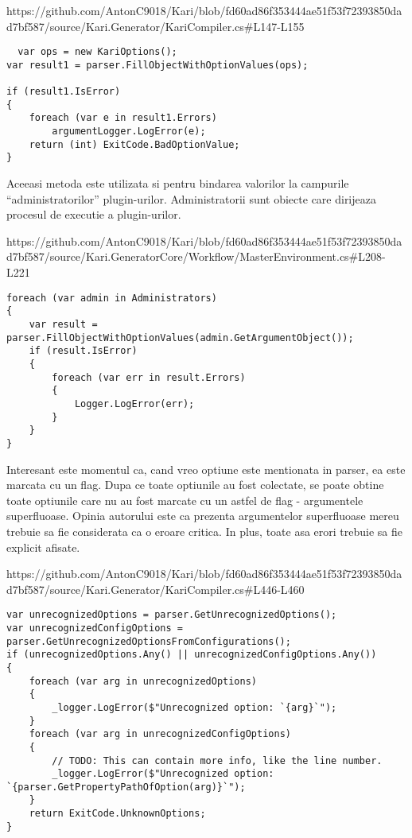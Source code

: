\documentclass{report}
\begin{document}
https://github.com/AntonC9018/Kari/blob/fd60ad86f353444ae51f53f72393850dad7bf587/source/Kari.Generator/KariCompiler.cs\#L147-L155

\begin{lstlisting}
  var ops = new KariOptions();
var result1 = parser.FillObjectWithOptionValues(ops);

if (result1.IsError)
{
    foreach (var e in result1.Errors)
        argumentLogger.LogError(e);
    return (int) ExitCode.BadOptionValue;
}
\end{lstlisting}

Aceeasi metoda este utilizata si pentru bindarea valorilor la campurile
``administratorilor'' plugin-urilor. Administratorii sunt obiecte care
dirijeaza procesul de executie a plugin-urilor.

https://github.com/AntonC9018/Kari/blob/fd60ad86f353444ae51f53f72393850dad7bf587/source/Kari.GeneratorCore/Workflow/MasterEnvironment.cs\#L208-L221

\begin{lstlisting}
foreach (var admin in Administrators)
{
    var result = parser.FillObjectWithOptionValues(admin.GetArgumentObject());
    if (result.IsError)
    {
        foreach (var err in result.Errors)
        {
            Logger.LogError(err);
        }
    }
}
\end{lstlisting}

Interesant este momentul ca, cand vreo optiune este mentionata in
parser, ea este marcata cu un flag. Dupa ce toate optiunile au fost
colectate, se poate obtine toate optiunile care nu au fost marcate cu un
astfel de flag - argumentele superfluoase. Opinia autorului este ca
prezenta argumentelor superfluoase mereu trebuie sa fie considerata ca o
eroare critica. In plus, toate asa erori trebuie sa fie explicit
afisate.

https://github.com/AntonC9018/Kari/blob/fd60ad86f353444ae51f53f72393850dad7bf587/source/Kari.Generator/KariCompiler.cs\#L446-L460

\begin{lstlisting}
var unrecognizedOptions = parser.GetUnrecognizedOptions();
var unrecognizedConfigOptions = parser.GetUnrecognizedOptionsFromConfigurations();
if (unrecognizedOptions.Any() || unrecognizedConfigOptions.Any())
{
    foreach (var arg in unrecognizedOptions)
    {
        _logger.LogError($"Unrecognized option: `{arg}`");
    }
    foreach (var arg in unrecognizedConfigOptions)
    {
        // TODO: This can contain more info, like the line number.
        _logger.LogError($"Unrecognized option: `{parser.GetPropertyPathOfOption(arg)}`");
    }
    return ExitCode.UnknownOptions;
}
\end{lstlisting}
\end{document}
